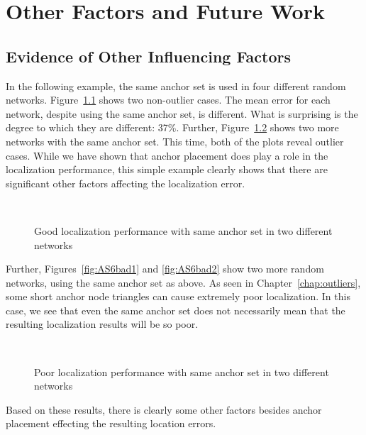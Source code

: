 \chapter{Other Factors and Future Work}

\section{Evidence of Other Influencing Factors}
\label{sec:otherfactors}

In the following example, the same anchor set is used in four different random networks.  Figure~\ref{fig:AS6good} shows two non-outlier cases.  The mean error for each network, despite using the same anchor set, is different.  What is surprising is the degree to which they are different: 37\%.  Further, Figure~\ref{fig:AS6bad} shows two more networks with the same anchor set.  This time, both of the plots reveal outlier cases.  While we have shown that anchor placement does play a role in the localization performance, this simple example clearly shows that there are significant other factors affecting the localization error.

\begin{figure}
  \centering
	\\
	\caption{Good localization performance with same anchor set in two different networks}
	\label{fig:AS6good}
\end{figure}

Further, Figures~\ref{fig:AS6bad1} and \ref{fig:AS6bad2} show two more random networks, using the same anchor set as above.  As seen in Chapter~\ref{chap:outliers}, some short anchor node triangles can cause extremely poor localization.  In this case, we see that even the same anchor set does not necessarily mean that the resulting localization results will be so poor.  

\begin{figure}
  \centering
\\
    \caption{Poor localization performance with same anchor set in two different networks}
	\label{fig:AS6bad}
\end{figure}

Based on these results, there is clearly some other factors besides anchor placement effecting the resulting location errors. 